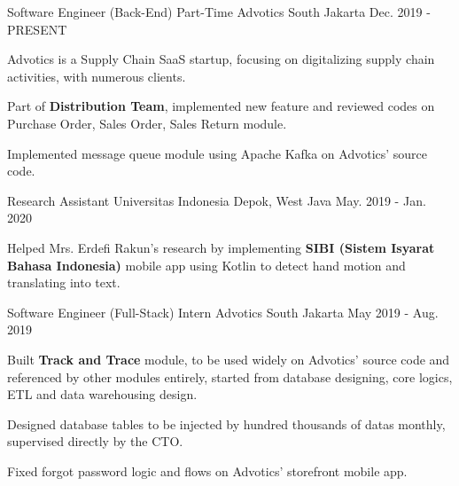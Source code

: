 
\begin{cventries}
  \cventry
    {Software Engineer (Back-End) Part-Time} %
    {Advotics} %
    {South Jakarta} %
    {Dec. 2019 - PRESENT} %
    {
      \begin{cvitems} %
        \item Advotics is a Supply Chain SaaS startup, focusing on digitalizing supply chain activities, with numerous clients.
        \item Part of \textbf{Distribution Team}, implemented new feature and reviewed codes on Purchase Order, Sales Order, Sales Return module.
        \item Implemented message queue module using Apache Kafka on Advotics' source code.
      \end{cvitems}
    }
    
  \cventry
    {Research Assistant} %
    {Universitas Indonesia} %
    {Depok, West Java} %
    {May. 2019 - Jan. 2020} %
    {
      \begin{cvitems} %
        \item Helped Mrs. Erdefi Rakun's research by implementing \textbf{SIBI (Sistem Isyarat Bahasa Indonesia)} mobile app using Kotlin to detect hand motion and translating into text.
      \end{cvitems}
    }

  \cventry
    {Software Engineer (Full-Stack) Intern} %
    {Advotics} %
    {South Jakarta} %
    {May 2019 - Aug. 2019} %
    {
      \begin{cvitems} %
        \item Built \textbf{Track and Trace} module, to be used widely on Advotics' source code and referenced by other modules entirely, started from database designing, core logics, ETL and data warehousing design.
        \item Designed database tables to be injected by hundred thousands of datas monthly, supervised directly by the CTO.
        \item Fixed forgot password logic and flows on Advotics' storefront mobile app.
      \end{cvitems}
    }
    

\end{cventries}
